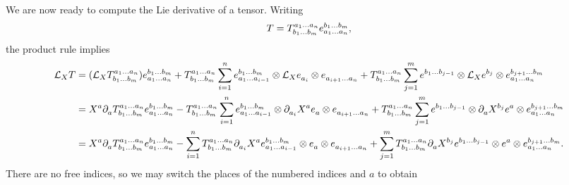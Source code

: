 We are now ready to compute the Lie derivative of a tensor. Writing
\begin{align*}
	T = \tensor*{T}{^{a_{1}\dots a_{n}}_{b_{1}\dots b_{m}}}\tensor*{e}{^{b_{1}\dots b_{m}}_{a_{1}\dots a_{n}}},
\end{align*}
the product rule implies
\begin{align*}
	\lied{X}{T} &= (\lied{X}{\tensor*{T}{^{a_{1}\dots a_{n}}_{b_{1}\dots b_{m}}}})\tensor*{e}{^{b_{1}\dots b_{m}}_{a_{1}\dots a_{n}}} + \tensor*{T}{^{a_{1}\dots a_{n}}_{b_{1}\dots b_{m}}}\sum\limits_{i = 1}^{n}\tensor*{e}{^{b_{1}\dots b_{m}}_{a_{1}\dots a_{i - 1}}}\otimes\lied{X}{\tensor*{e}{_{a_{i}}}}\otimes\tensor*{e}{_{a_{i + 1}\dots a_{n}}} + \tensor*{T}{^{a_{1}\dots a_{n}}_{b_{1}\dots b_{m}}}\sum\limits_{j = 1}^{m}\tensor*{e}{^{b_{1}\dots b_{j - 1}}}\otimes\lied{X}{\tensor*{e}{^{b_{j}}}}\otimes\tensor*{e}{^{b_{j + 1}\dots b_{m}}_{a_{1}\dots a_{n}}} \\
	            &= X^{a}\del{a}{\tensor*{T}{^{a_{1}\dots a_{n}}_{b_{1}\dots b_{m}}}}\tensor*{e}{^{b_{1}\dots b_{m}}_{a_{1}\dots a_{n}}} - \tensor*{T}{^{a_{1}\dots a_{n}}_{b_{1}\dots b_{m}}}\sum\limits_{i = 1}^{n}\tensor*{e}{^{b_{1}\dots b_{m}}_{a_{1}\dots a_{i - 1}}}\otimes \del{a_{i}}{X^{a}}\tensor*{e}{_{a}}\otimes\tensor*{e}{_{a_{i + 1}\dots a_{n}}} + \tensor*{T}{^{a_{1}\dots a_{n}}_{b_{1}\dots b_{m}}}\sum\limits_{j = 1}^{m}\tensor*{e}{^{b_{1}\dots b_{j - 1}}}\otimes \del{a}{X^{b_{j}}}\tensor*{e}{^{a}}\otimes\tensor*{e}{^{b_{j + 1}\dots b_{m}}_{a_{1}\dots a_{n}}} \\
	            &= X^{a}\del{a}{\tensor*{T}{^{a_{1}\dots a_{n}}_{b_{1}\dots b_{m}}}}\tensor*{e}{^{b_{1}\dots b_{m}}_{a_{1}\dots a_{n}}} - \sum\limits_{i = 1}^{n}\tensor*{T}{^{a_{1}\dots a_{n}}_{b_{1}\dots b_{m}}}\del{a_{i}}{X^{a}}\tensor*{e}{^{b_{1}\dots b_{m}}_{a_{1}\dots a_{i - 1}}}\otimes\tensor*{e}{_{a}}\otimes\tensor*{e}{_{a_{i + 1}\dots a_{n}}} + \sum\limits_{j = 1}^{m}\tensor*{T}{^{a_{1}\dots a_{n}}_{b_{1}\dots b_{m}}}\del{a}{X^{b_{j}}}\tensor*{e}{^{b_{1}\dots b_{j - 1}}}\otimes\tensor*{e}{^{a}}\otimes\tensor*{e}{^{b_{j + 1}\dots b_{m}}_{a_{1}\dots a_{n}}}.
\end{align*}
There are no free indices, so we may switch the places of the numbered indices and $a$ to obtain
